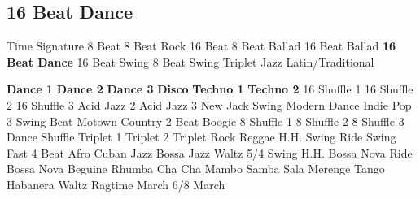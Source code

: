 \subsection{16 Beat Dance}
Time Signature
8 Beat
8 Beat Rock
16 Beat
8 Beat Ballad
16 Beat Ballad
\textbf{16 Beat Dance}
16 Beat Swing
8 Beat Swing
Triplet
Jazz
Latin/Traditional





























\textbf{Dance 1}
\textbf{Dance 2}
\textbf{Dance 3}
\textbf{Disco}
\textbf{Techno 1}
\textbf{Techno 2}
16 Shuffle 1
16 Shuffle 2
16 Shuffle 3
Acid Jazz 2
Acid Jazz 3
New Jack Swing
Modern Dance
Indie Pop 3
Swing Beat
Motown
Country 2 Beat
Boogie
8 Shuffle 1
8 Shuffle 2
8 Shuffle 3
Dance Shuffle
Triplet 1
Triplet 2
Triplet Rock
Reggae
H.H. Swing
Ride Swing
Fast 4 Beat
Afro Cuban
Jazz Bossa
Jazz Waltz
5/4 Swing
H.H. Bossa Nova
Ride Bossa Nova
Beguine
Rhumba
Cha Cha
Mambo
Samba
Sala
Merenge
Tango
Habanera
Waltz
Ragtime
March
6/8 March
